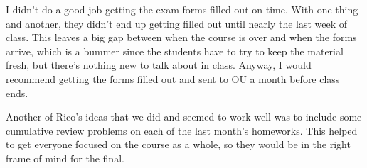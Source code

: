 \documentclass{article}
\begin{document}
I didn't do a good job getting the exam forms filled out on time.  With one thing and another, they didn't end up getting
filled out until nearly the last week of class.  This leaves a big gap between when the course is over and when the
forms arrive, which is a bummer since the students have to try to keep the material fresh, but there's nothing new to
talk about in class.  Anyway, I would recommend getting the forms filled out and sent to OU a month before class ends.

Another of Rico's ideas that we did and seemed to work well was to include some cumulative review problems on each of the last
month's homeworks.  This helped to get everyone focused on the course as a whole, so they would be in the right frame of
mind for the final.
\end{document}
